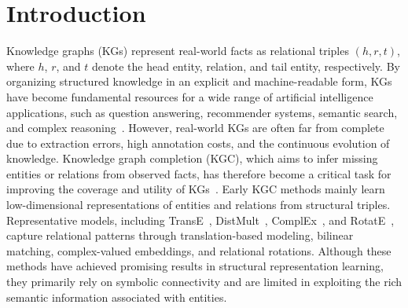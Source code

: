 \documentclass[pdflatex,sn-mathphys-num]{sn-jnl}
\begin{document}

\maketitle

\section{Introduction}

Knowledge graphs (KGs) represent real-world facts as relational triples $(h,r,t)$, where $h$, $r$, and $t$ denote the head entity, relation, and tail entity, respectively. By organizing structured knowledge in an explicit and machine-readable form, KGs have become fundamental resources for a wide range of artificial intelligence applications, such as question answering, recommender systems, semantic search, and complex reasoning~\cite{JKSUC_KG,JKSUC_KG2}. However, real-world KGs are often far from complete due to extraction errors, high annotation costs, and the continuous evolution of knowledge. Knowledge graph completion (KGC), which aims to infer missing entities or relations from observed facts, has therefore become a critical task for improving the coverage and utility of KGs~\cite{JKSUC_KGC}. Early KGC methods mainly learn low-dimensional representations of entities and relations from structural triples. Representative models, including TransE~\cite{bordes2013transe}, DistMult~\cite{yang2015distmult}, ComplEx~\cite{trouillon2016complex}, and RotatE~\cite{sun2019rotate}, capture relational patterns through translation-based modeling, bilinear matching, complex-valued embeddings, and relational rotations. Although these methods have achieved promising results in structural representation learning, they primarily rely on symbolic connectivity and are limited in exploiting the rich semantic information associated with entities.
\end{document}
